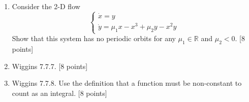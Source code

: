 \documentclass{article}
\begin{document}
\begin{enumerate}
 \item  Consider the 2-D flow
 \begin{equation}
\left\{\begin{array}{l}
\dot x = y \\
\dot y = \mu_1 x - x^3 + \mu_2 y - x^2 y  
\end{array}\right.
\end{equation}
Show that this system has no periodic orbits for any $\mu_1 \in \mathbb{R}$ and $\mu_2 < 0$. [8 points]



   


\item  Wiggins 7.7.7. [8 points]

\item  Wiggins 7.7.8. Use the definition that a function must be non-constant to count as an integral. [8 points]


\end{enumerate} 
 
\end{document}
